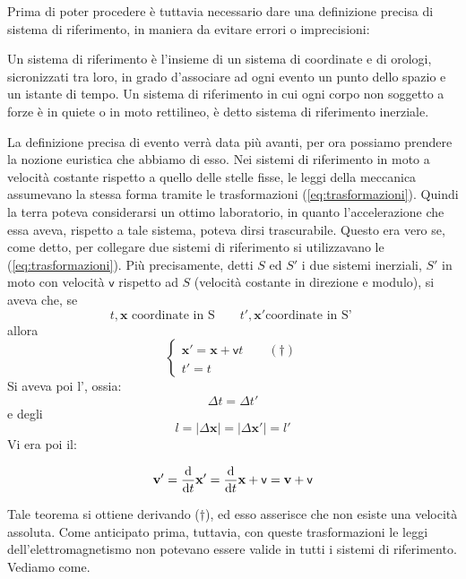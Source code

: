 Prima di poter procedere \`e tuttavia necessario dare
una definizione precisa di sistema di riferimento, in maniera da
evitare errori o imprecisioni:
\begin{definizione}
  Un sistema di riferimento \`e l'insieme di un sistema di coordinate
  e di orologi, sicronizzati tra loro, in grado d'associare ad ogni
  evento un punto dello spazio e un istante di tempo. Un sistema di
  riferimento in cui ogni corpo non soggetto a forze \`e in quiete o
  in moto rettilineo, \`e detto sistema di riferimento inerziale.
\end{definizione}
La definizione precisa di evento verr\`a data pi\`u avanti, per ora
possiamo prendere la nozione euristica che abbiamo di esso. Nei sistemi
di riferimento in moto a velocit\`a costante rispetto a quello delle
stelle fisse, le leggi della meccanica assumevano la stessa forma
tramite le trasformazioni (\ref{eq:trasformazioni}). Quindi la terra
poteva considerarsi un ottimo laboratorio, in quanto
l'accelerazione che essa aveva, rispetto
a tale sistema, poteva dirsi trascurabile. Questo era vero se, come
detto, per collegare due sistemi di riferimento si utilizzavano le
(\ref{eq:trasformazioni}). Pi\`u
precisamente, detti $S$ ed $S'$ i due sistemi inerziali, $S'$ in moto
con velocit\`a $\mathsf{v}$ rispetto ad $S$ (velocit\`a costante in
direzione e modulo), si aveva che, se
\begin{displaymath}
  t,\mathbf{x} \mbox{ coordinate in S} \qquad t',\mathbf{x}' \mbox{
    coordinate in S' }
\end{displaymath}
allora
\begin{equation}
  \left\{\begin{array}{l}
      \mathbf{x}'=\mathbf{x}+\mathbf{\mathsf{v}}t\qquad
      (\dagger)\\
      t'=t\end{array}\right. \label{eq:trasformazioni}
\end{equation}
 Si aveva poi l', ossia:
\begin{equation}
  \Delta t=\Delta t'\label{eq:invtempo}
\end{equation}
e degli 
\begin{equation}
  l = |\Delta\mathbf{x}| =
  |\Delta\mathbf{x}'|=l'\label{eq:invspazio}
\end{equation}  
Vi era poi il:
\begin{teorema}
  \begin{displaymath}
    \mathbf{v}'=\frac{\mathrm{d}}{\mathrm{d} t}\mathbf{x}'=\frac{\mathrm{d}}{\mathrm{d}
      t}\mathbf{x}+\mathbf{\mathsf{v}}=\mathbf{v}+\mathbf{\mathsf{v}}
  \end{displaymath}
\end{teorema}
Tale teorema si ottiene derivando ($\dagger$), ed esso asserisce che
non esiste una velocit\`a assoluta.  
%
\newline 
%
Come anticipato prima, tuttavia, con queste trasformazioni le leggi
dell'elettromagnetismo non potevano essere valide in tutti i sistemi di
riferimento. Vediamo come.
